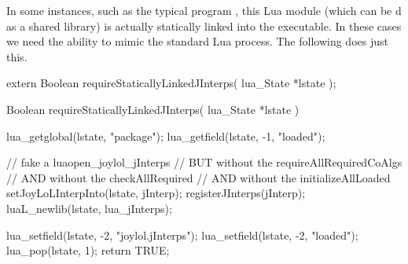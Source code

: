 In some instances, such as the typical  program 
, this Lua module (which can be d as a 
shared library) is actually statically linked into the executable. In 
these cases we need the ability to mimic the standard Lua  
process. The following  does just this. 

\startCHeader
extern Boolean requireStaticallyLinkedJInterps(
  lua_State *lstate
);
\stopCHeader

\startCCode
Boolean requireStaticallyLinkedJInterps(
  lua_State *lstate
) {
  lua_getglobal(lstate, "package");
  lua_getfield(lstate, -1, "loaded");
  
  // fake a luaopen_joylol_jInterps 
  // BUT without the requireAllRequiredCoAlgs
  // AND without the checkAllRequired
  // AND without the initializeAllLoaded
  setJoyLoLInterpInto(lstate, jInterp);
  registerJInterps(jInterp);
  luaL_newlib(lstate, lua_jInterps);
  
  lua_setfield(lstate, -2, "joylol.jInterps");
  lua_setfield(lstate, -2, "loaded");
  lua_pop(lstate, 1);
  return TRUE;
}
\stopCCode
